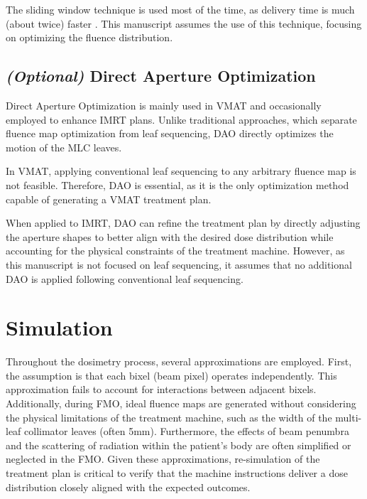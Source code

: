 The sliding window technique is used most of the time, as delivery time is much (about twice) faster \cite{Ning2003}.
This manuscript assumes the use of this technique, focusing on optimizing the fluence distribution.

\subsection[DAO]{\textit{(Optional)} Direct Aperture Optimization}
Direct Aperture Optimization is mainly used in VMAT and occasionally employed to enhance IMRT plans.
Unlike traditional approaches, which separate fluence map optimization from leaf sequencing, DAO directly optimizes the motion of the MLC leaves.

In VMAT, applying conventional leaf sequencing to any arbitrary fluence map is not feasible.
Therefore, DAO is essential, as it is the only optimization method capable of generating a VMAT treatment plan.

When applied to IMRT, DAO can refine the treatment plan by directly adjusting the aperture shapes to better align with the desired dose distribution while accounting for the physical constraints of the treatment machine.
However, as this manuscript is not focused on leaf sequencing, it assumes that no additional DAO is applied following conventional leaf sequencing.






\section{Simulation}
Throughout the dosimetry process, several approximations are employed.
First, the assumption is that each bixel (beam pixel) operates independently.
This approximation fails to account for interactions between adjacent bixels.
Additionally, during FMO, ideal fluence maps are generated without considering the physical limitations of the treatment machine, such as the width of the multi-leaf collimator leaves (often 5mm).
Furthermore, the effects of beam penumbra and the scattering of radiation within the patient's body are often simplified or neglected in the FMO.
Given these approximations, re-simulation of the treatment plan is critical to verify that the machine instructions deliver a dose distribution closely aligned with the expected outcomes.


